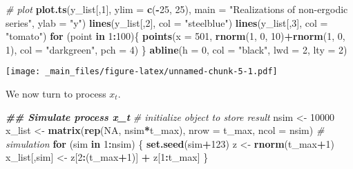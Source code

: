 \documentclass[
]{book}
\newenvironment{Shaded}{\begin{snugshade}}{\end{snugshade}}
\newcommand{\AttributeTok}[1]{\textcolor[rgb]{0.13,0.29,0.53}{#1}}
\newcommand{\CommentTok}[1]{\textcolor[rgb]{0.56,0.35,0.01}{\textit{#1}}}
\newcommand{\ConstantTok}[1]{\textcolor[rgb]{0.56,0.35,0.01}{#1}}
\newcommand{\ControlFlowTok}[1]{\textcolor[rgb]{0.13,0.29,0.53}{\textbf{#1}}}
\newcommand{\DecValTok}[1]{\textcolor[rgb]{0.00,0.00,0.81}{#1}}
\newcommand{\DocumentationTok}[1]{\textcolor[rgb]{0.56,0.35,0.01}{\textbf{\textit{#1}}}}
\newcommand{\FunctionTok}[1]{\textcolor[rgb]{0.13,0.29,0.53}{\textbf{#1}}}
\newcommand{\NormalTok}[1]{#1}
\newcommand{\OtherTok}[1]{\textcolor[rgb]{0.56,0.35,0.01}{#1}}
\newcommand{\SpecialCharTok}[1]{\textcolor[rgb]{0.81,0.36,0.00}{\textbf{#1}}}
\newcommand{\StringTok}[1]{\textcolor[rgb]{0.31,0.60,0.02}{#1}}
\begin{document}
\begin{Shaded}
\begin{Highlighting}[]
\CommentTok{\# plot}
\FunctionTok{plot.ts}\NormalTok{(y\_list[,}\DecValTok{1}\NormalTok{], }\AttributeTok{ylim =} \FunctionTok{c}\NormalTok{(}\SpecialCharTok{{-}}\DecValTok{25}\NormalTok{, }\DecValTok{25}\NormalTok{), }\AttributeTok{main =} \StringTok{"Realizations of non{-}ergodic series"}\NormalTok{, }\AttributeTok{ylab =} \StringTok{"y"}\NormalTok{)}
\FunctionTok{lines}\NormalTok{(y\_list[,}\DecValTok{2}\NormalTok{], }\AttributeTok{col =} \StringTok{"steelblue"}\NormalTok{)}
\FunctionTok{lines}\NormalTok{(y\_list[,}\DecValTok{3}\NormalTok{], }\AttributeTok{col =} \StringTok{"tomato"}\NormalTok{)}
\ControlFlowTok{for}\NormalTok{ (point }\ControlFlowTok{in} \DecValTok{1}\SpecialCharTok{:}\DecValTok{100}\NormalTok{)\{}
  \FunctionTok{points}\NormalTok{(}\AttributeTok{x =} \DecValTok{501}\NormalTok{, }\FunctionTok{rnorm}\NormalTok{(}\DecValTok{1}\NormalTok{, }\DecValTok{0}\NormalTok{, }\DecValTok{10}\NormalTok{)}\SpecialCharTok{+}\FunctionTok{rnorm}\NormalTok{(}\DecValTok{1}\NormalTok{, }\DecValTok{0}\NormalTok{, }\DecValTok{1}\NormalTok{), }\AttributeTok{col =} \StringTok{"darkgreen"}\NormalTok{, }\AttributeTok{pch =} \DecValTok{4}\NormalTok{)}
\NormalTok{\}}
\FunctionTok{abline}\NormalTok{(}\AttributeTok{h =} \DecValTok{0}\NormalTok{, }\AttributeTok{col =} \StringTok{"black"}\NormalTok{, }\AttributeTok{lwd =} \DecValTok{2}\NormalTok{, }\AttributeTok{lty =} \DecValTok{2}\NormalTok{)}
\end{Highlighting}
\end{Shaded}

\texttt{[image: \_main\_files/figure-latex/unnamed-chunk-5-1.pdf]}

We now turn to process \(x_t\).

\begin{Shaded}
\begin{Highlighting}[]
\DocumentationTok{\#\# Simulate process x\_t}
\CommentTok{\# initialize object to store result}
\NormalTok{nsim }\OtherTok{\textless{}{-}} \DecValTok{10000}
\NormalTok{x\_list }\OtherTok{\textless{}{-}} \FunctionTok{matrix}\NormalTok{(}\FunctionTok{rep}\NormalTok{(}\ConstantTok{NA}\NormalTok{, nsim}\SpecialCharTok{*}\NormalTok{t\_max), }\AttributeTok{nrow =}\NormalTok{ t\_max, }\AttributeTok{ncol =}\NormalTok{ nsim)}
\CommentTok{\# simulation}
\ControlFlowTok{for}\NormalTok{ (sim }\ControlFlowTok{in} \DecValTok{1}\SpecialCharTok{:}\NormalTok{nsim) \{}
  \FunctionTok{set.seed}\NormalTok{(sim}\SpecialCharTok{+}\DecValTok{123}\NormalTok{)}
\NormalTok{  z  }\OtherTok{\textless{}{-}} \FunctionTok{rnorm}\NormalTok{(t\_max}\SpecialCharTok{+}\DecValTok{1}\NormalTok{)}
\NormalTok{  x\_list[,sim] }\OtherTok{\textless{}{-}}\NormalTok{ z[}\DecValTok{2}\SpecialCharTok{:}\NormalTok{(t\_max}\SpecialCharTok{+}\DecValTok{1}\NormalTok{)] }\SpecialCharTok{+}\NormalTok{ z[}\DecValTok{1}\SpecialCharTok{:}\NormalTok{t\_max]}
\NormalTok{\}}
\end{Highlighting}
\end{Shaded}
\end{document}
